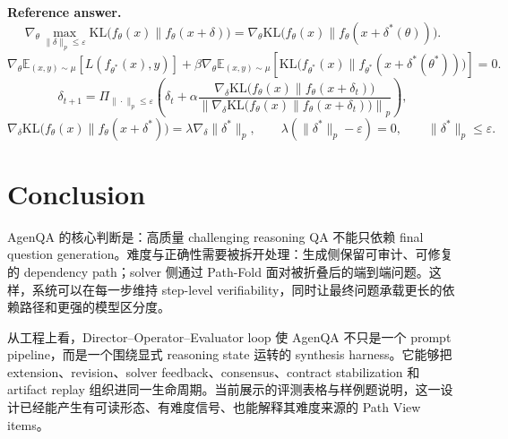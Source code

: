 \documentclass[11pt]{ctexart}
\begin{document}
\textbf{Reference answer.}
\[
\nabla_\theta
\max_{\|\delta\|_p\leq\varepsilon}
\mathrm{KL}\bigl(f_\theta(x)\|f_\theta(x+\delta)\bigr)
=
\nabla_\theta
\mathrm{KL}\bigl(f_\theta(x)\|f_\theta(x+\delta^\ast(\theta))\bigr).
\]
\[
\nabla_\theta\mathbb{E}_{(x,y)\sim\mu}
\left[L(f_{\theta^\ast}(x),y)\right]
+
\beta\nabla_\theta\mathbb{E}_{(x,y)\sim\mu}
\left[
\mathrm{KL}\bigl(f_{\theta^\ast}(x)\|f_{\theta^\ast}(x+\delta^\ast(\theta^\ast))\bigr)
\right]=0.
\]
\[
\delta_{t+1}
=
\Pi_{\|\cdot\|_p\leq\varepsilon}
\left(
\delta_t+
\alpha
\frac{
\nabla_\delta\mathrm{KL}\bigl(f_\theta(x)\|f_\theta(x+\delta_t)\bigr)
}{
\left\|
\nabla_\delta\mathrm{KL}\bigl(f_\theta(x)\|f_\theta(x+\delta_t)\bigr)
\right\|_p
}
\right),
\]
\[
\nabla_\delta\mathrm{KL}\bigl(f_\theta(x)\|f_\theta(x+\delta^\ast)\bigr)
=
\lambda\nabla_\delta\|\delta^\ast\|_p,\qquad
\lambda(\|\delta^\ast\|_p-\varepsilon)=0,\qquad
\|\delta^\ast\|_p\leq\varepsilon.
\]

\section{Conclusion}

AgenQA 的核心判断是：高质量 challenging reasoning QA 不能只依赖 final question generation。难度与正确性需要被拆开处理：生成侧保留可审计、可修复的 dependency path；solver 侧通过 Path-Fold 面对被折叠后的端到端问题。这样，系统可以在每一步维持 step-level verifiability，同时让最终问题承载更长的依赖路径和更强的模型区分度。

从工程上看，Director--Operator--Evaluator loop 使 AgenQA 不只是一个 prompt pipeline，而是一个围绕显式 reasoning state 运转的 synthesis harness。它能够把 extension、revision、solver feedback、consensus、contract stabilization 和 artifact replay 组织进同一生命周期。当前展示的评测表格与样例题说明，这一设计已经能产生有可读形态、有难度信号、也能解释其难度来源的 Path View items。
\end{document}
